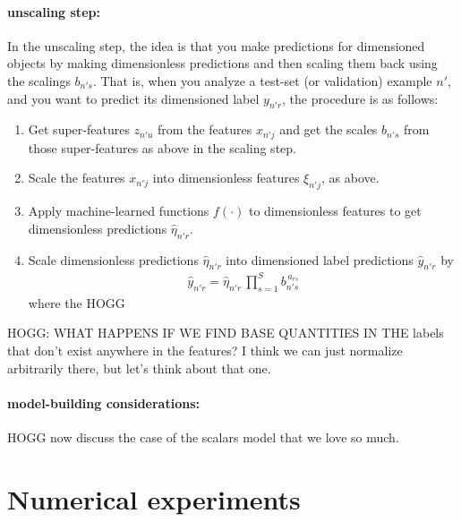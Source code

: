\documentclass[12pt, letterpaper]{article}
\begin{document}
\paragraph{unscaling step:}
In the unscaling step, the idea is that you make predictions for dimensioned objects by making dimensionless predictions and then scaling them back using the scalings $b_{n's}$.
That is, when you analyze a test-set (or validation) example $n'$, and you want to predict its dimensioned label $y_{n'r}$, the procedure is as follows:
\begin{enumerate}
    \item Get super-features $z_{n'u}$ from the features $x_{n'j}$ and get the scales $b_{n's}$ from those super-features as above in the scaling step.
    \item Scale the features $x_{n'j}$ into dimensionless features $\xi_{n'j}$, as above.
    \item Apply machine-learned functions $f(\cdot)$ to dimensionless features to get dimensionless predictions $\hat{\eta}_{n'r}$.
    \item Scale dimensionless predictions $\hat{\eta}_{n'r}$ into dimensioned label predictions $\hat{y}_{n'r}$ by
    \begin{align}
        \hat{y}_{n'r} = \hat{\eta}_{n'r}\,\prod_{s=1}^S b_{n's}^{\,a_{rs}}
    \end{align}
    where the HOGG
\end{enumerate}

HOGG: WHAT HAPPENS IF WE FIND BASE QUANTITIES IN THE labels that don't exist anywhere in the features? I think we can just normalize arbitrarily there, but let's think about that one.

\paragraph{model-building considerations:}
HOGG now discuss the case of the scalars model that we love so much.

\section{Numerical experiments}
\end{document}
